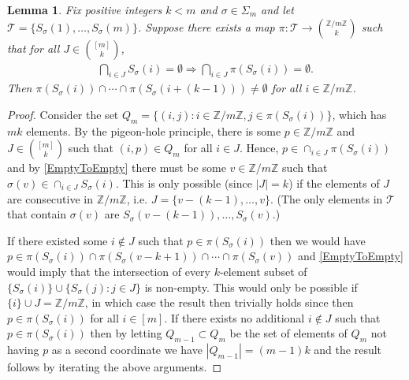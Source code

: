 \documentclass[journal, onecolumn]{IEEEtran}
\newtheorem{lemma}{Lemma}
\begin{document}

\begin{lemma}\label{NonEmptyLemma} Fix positive integers $k < m$ and $\sigma \in \Sigma_m$ and let $\mathcal{T} = \{S_\sigma(1), \ldots, S_\sigma(m)\}$. Suppose there exists a map $\pi: \mathcal{T} \to {\mathbb{Z}/m\mathbb{Z} \choose k}$ such that for all $J \in {[m] \choose k}$,
\begin{align}\label{EmptyToEmpty}
 \bigcap_{i \in J} S_\sigma(i) = \emptyset \Longrightarrow \bigcap_{i \in J} \pi(S_\sigma(i)) = \emptyset.
\end{align}
%
Then  $\pi(S_\sigma(i)) \cap \cdots \cap \pi(S_\sigma(i+(k-1))) \neq \emptyset$ for all $i \in \mathbb{Z}/m\mathbb{Z}$.
\end{lemma}

\begin{proof} Consider the set $Q_m = \{ (i,j) : i \in \mathbb{Z}/m\mathbb{Z}, j \in \pi(S_\sigma(i)) \}$, which has $mk$ elements. By the pigeon-hole principle, there is some $p \in \mathbb{Z}/m\mathbb{Z}$ and $J \in {[m] \choose k}$ such that $(i, p) \in Q_m$ for all $i \in J$. Hence, $p \in \cap_{i \in J} \pi(S_\sigma(i))$ and by \eqref{EmptyToEmpty} there must be some $v \in \mathbb{Z}/m\mathbb{Z}$ such that $\sigma(v) \in \cap_{i \in J} S_\sigma(i)$. This is only possible (since $|J| = k$) if the elements of $J$ are consecutive in $\mathbb{Z}/m\mathbb{Z}$, i.e. $J = \{v - (k-1), \ldots, v\}$. (The only elements in $\mathcal{T}$ that contain $\sigma(v)$ are $S_\sigma(v-(k-1)), \ldots, S_\sigma(v)$.)

If there existed some $i \notin J$ such that $p \in \pi(S_\sigma(i))$ then we would have $p \in \pi(S_\sigma(i)) \cap \pi(S_\sigma(v - k+1)) \cap \cdots \cap \pi(S_\sigma(v))$ and \eqref{EmptyToEmpty} would imply that the intersection of every $k$-element subset of $\{S_\sigma(i)\} \cup \{S_\sigma(j): j \in J\}$ is non-empty. This would only be possible if $\{i\} \cup J = \mathbb{Z}/m\mathbb{Z}$, in which case the result then trivially holds since then $p \in \pi(S_\sigma(i))$ for all $i \in [m]$. If there exists no additional $i \notin J$ such that $p \in \pi(S_\sigma(i))$ then by letting $Q_{m-1} \subset Q_m$ be the set of elements of $Q_m$ not having $p$ as a second coordinate we have $|Q_{m-1}| = (m-1)k$ and the result follows by iterating the above arguments.
\end{proof}

\end{document}
